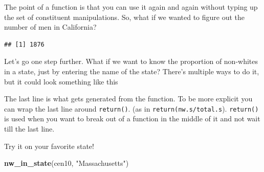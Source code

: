 \documentclass[
]{book}
\newenvironment{Shaded}{\begin{snugshade}}{\end{snugshade}}
\newcommand{\ControlFlowTok}[1]{\textcolor[rgb]{0.13,0.29,0.53}{\textbf{#1}}}
\newcommand{\KeywordTok}[1]{\textcolor[rgb]{0.13,0.29,0.53}{\textbf{#1}}}
\newcommand{\NormalTok}[1]{#1}
\newcommand{\OperatorTok}[1]{\textcolor[rgb]{0.81,0.36,0.00}{\textbf{#1}}}
\newcommand{\StringTok}[1]{\textcolor[rgb]{0.31,0.60,0.02}{#1}}
\theoremstyle{definition}
\theoremstyle{definition}
\theoremstyle{definition}
\theoremstyle{definition}
\theoremstyle{remark}
\begin{document}
The point of a function is that you can use it again and again without typing up the set of constituent manipulations. So, what if we wanted to figure out the number of men in California?

\begin{Shaded}
\end{Shaded}

\begin{verbatim}
## [1] 1876
\end{verbatim}

Let's go one step further. What if we want to know the proportion of non-whites in a state, just by entering the name of the state? There's multiple ways to do it, but it could look something like this

\begin{Shaded}
\end{Shaded}

The last line is what gets generated from the function. To be more explicit you can wrap the last line around \texttt{return()}. (as in \texttt{return(nw.s/total.s}). \texttt{return()} is used when you want to break out of a function in the middle of it and not wait till the last line.

Try it on your favorite state!

\begin{Shaded}
\begin{Highlighting}[]
\KeywordTok{nw_in_state}\NormalTok{(cen10, }\StringTok{"Massachusetts"}\NormalTok{)}
\end{Highlighting}
\end{Shaded}
\end{document}

